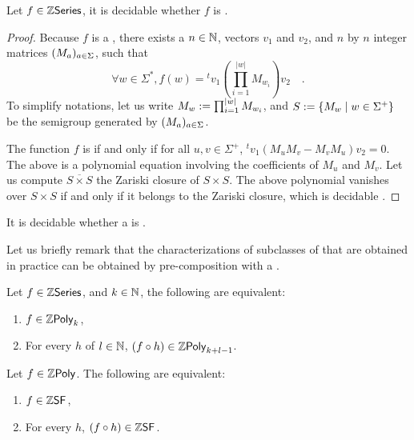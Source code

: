 \begin{lemma}
    \label{decidable-commutative-rat:lemma}
    Let $f \in \mathbb{Z}\mathsf{Series}$, it is decidable whether
    $f$ is .
\end{lemma}
\begin{proof}
    Because $f$ is a ,
    there exists a $n \in \mathbb{N}$,
    vectors $v_1$ and $v_2$,
    and $n$ by $n$ integer matrices $(M_a)_{a \in \Sigma}$,
    such that
    \begin{equation*}
        \forall w \in \Sigma^*,
        f(w) = {}^t v_1 \left(\prod_{i = 1}^{|w|} M_{w_i}\right) v_2 \quad .
    \end{equation*}
    To simplify notations, 
    let us write $M_w \mathrel{:=} \prod_{i = 1}^{|w|} M_{w_i}$,
    and 
    $S \mathrel{:=} \mathopen{\{} M_w \mid w \in \Sigma^+ \mathclose{\}}$ be the
    semigroup generated by $(M_a)_{a \in \Sigma}$.

    The function $f$ is  if and only if for all $u,v \in
    \Sigma^+$, ${}^t v_1 (M_u M_v  - M_v M_u) v_2 = 0$. The above is a
    polynomial equation involving the coefficients of $M_u$ and $M_v$.
    Let us compute $\overline{S \times S}$ the Zariski closure of $S \times S$.
    The above polynomial vanishes over $S \times S$ if and only
    if it belongs to the Zariski closure, which is decidable
    \cite{HROUPOWO18}.
\end{proof}

\begin{conjecture}
    It is decidable whether a 
    is .
\end{conjecture}

Let us briefly remark that the characterizations of subclasses of
 that are obtained in practice can be obtained by
pre-composition with a  .

\begin{remark}
    Let $f \in \mathbb{Z}\mathsf{Series}$, and $k \in \mathbb{N}$,
    the following are equivalent:
    \begin{enumerate}
        \item $f \in \ZPoly[k]$,
        \item For every   $h$
            of  $l \in \mathbb{N}$,
            $(f \circ h) \in \ZPoly[k+l-1]$.
    \end{enumerate}
\end{remark}


\begin{remark}
    Let $f \in \ZPoly$.
    The following are equivalent:
    \begin{enumerate}
        \item $f \in \ZSF$,
        \item For every   $h$,
            $(f \circ h) \in \ZSF$.
    \end{enumerate}
\end{remark}

